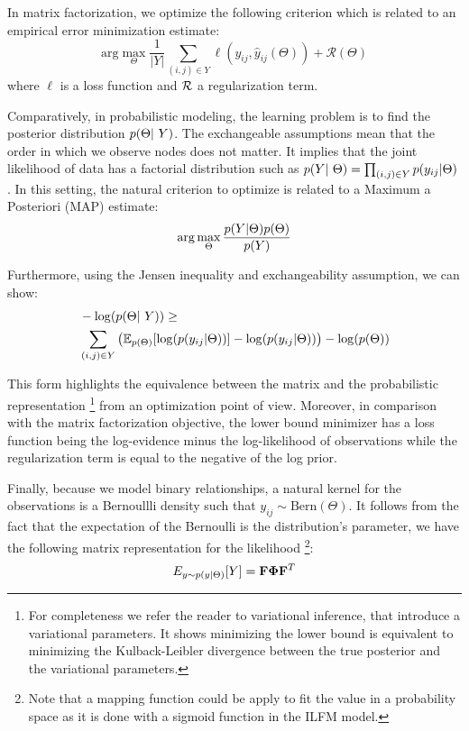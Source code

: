 In matrix factorization, we optimize the following criterion which is related to an empirical error minimization estimate:
\begin{displaymath}
    \mathrm{arg}\max\limits_{\Theta} \frac{1}{|Y|} \sum_{(i,j) \in Y} \ell(y_{ij}, \hat y_{ij}(\Theta)) + \mathcal{R}(\Theta)
\end{displaymath}
where $\ell$ is a loss function and $\cal R$ a regularization term.

Comparatively, in probabilistic modeling, the learning problem is to find the posterior distribution $\p(\Theta | Y)$. The exchangeable assumptions mean that the order in which we observe nodes does not matter. It implies that the joint likelihood of data has a factorial distribution such as $\p(Y | \Theta) = \prod_{(i,j) \in Y} \p(y_{ij}| \Theta)$. In this setting, the natural criterion to optimize is related to a Maximum a Posteriori (MAP) estimate: 
\begin{displaymath}
    \mathrm{arg}\max\limits_{\Theta}  \frac{p(Y | \Theta) p(\Theta)}{p(Y)} 
\end{displaymath}

Furthermore, using the Jensen inequality and exchangeability assumption, we can show:
\begin{align}
    &- \log(\p(\Theta | Y)) \geq \nonumber \\  
    &\sum_{(i,j) \in Y} \left( \E_{p(\Theta)}[\log(\p(y_{ij}|\Theta))] - \log(\p(y_{ij}|\Theta)) \right) - \log(\p(\Theta))
\end{align}	


This form highlights the equivalence between the matrix and the probabilistic representation \footnote{For completeness we refer the reader to variational inference, that introduce a variational parameters. It shows minimizing the lower bound is equivalent to minimizing the Kulback-Leibler divergence between the true posterior and the variational parameters.} from an optimization point of view. Moreover, in comparison with the  matrix factorization objective, the lower bound minimizer has a loss function being the log-evidence minus the log-likelihood of observations while the regularization term is equal to the negative of the log prior.


Finally, because we model binary relationships, a natural kernel for the observations is a Bernoullli density such that $y_{ij} \sim \text{Bern}(\Theta)$. It follows from the fact that the expectation of the Bernoulli is the distribution's parameter, we have the following matrix representation for the likelihood \footnote{Note that a mapping function could be apply to fit the value in a probability space as it is done with a sigmoid function in the ILFM model.}:
\begin{equation}
E_{y \sim p(y \mid \Theta)}[Y] = \mathbf{F} \mathbf{\Phi}  \mathbf{F}^T
\end{equation}

